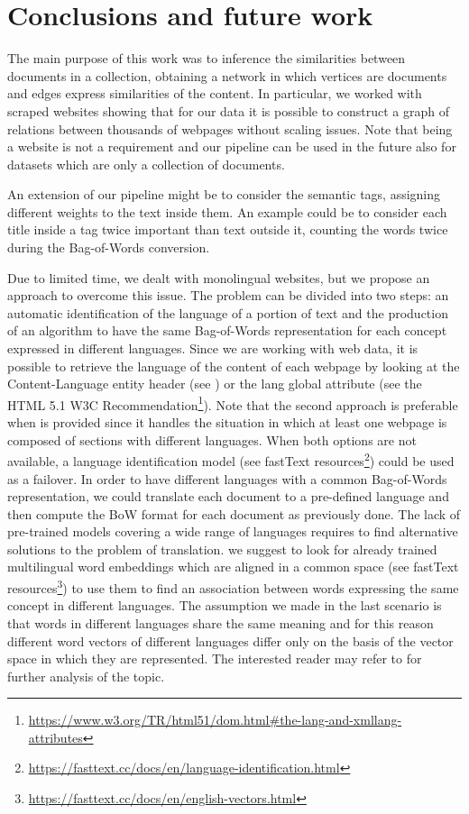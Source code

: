 \chapter{Conclusions and future work} \label{conclusions}
The main purpose of this work was to inference
the similarities between documents in a collection,
obtaining a network in which vertices are documents and
edges express similarities of the content.
In particular, we worked with scraped websites
showing that for our data it is possible to construct
a graph of relations between thousands of webpages
without scaling issues. 
Note that being a website is not a requirement and 
our pipeline can be used in the future also for 
datasets which are only a collection of documents.

An extension of our pipeline might be to consider the semantic tags, 
assigning different weights to the text inside them. 
An example could be to consider each title inside a  
tag twice important than text outside it, 
counting the words twice during the Bag-of-Words conversion.

Due to limited time, we dealt with monolingual
websites, but we propose an approach to overcome this issue.
The problem can be divided into two steps:
an automatic identification of the language of a portion of text and
the production of an algorithm to have the same Bag-of-Words
representation for each concept expressed in different languages.
Since we are working with web data, it is possible to retrieve the language
of the content of each webpage by looking at the Content-Language entity header
(see \cite{rfc7231}) or the lang global attribute
(see the HTML 5.1 W3C Recommendation\footnote{\url{https://www.w3.org/TR/html51/dom.html\#the-lang-and-xmllang-attributes}}).
Note that the second approach is preferable when  is provided
since it handles the situation in which at least
one webpage is composed of sections with different languages.
When both options are not available,
a language identification model
(see fastText resources\footnote{\url{https://fasttext.cc/docs/en/language-identification.html}})
could be used as a failover.
In order to have different languages with a common Bag-of-Words
representation, we could translate each document to a pre-defined language
and then compute the BoW format for each document as previously done.
The lack of pre-trained models covering a wide range
of languages requires to find alternative solutions to the problem of translation.
we suggest to look for already trained multilingual word embeddings
which are aligned in a common space (see fastText resources\footnote{\url{https://fasttext.cc/docs/en/english-vectors.html}})
to use them to find an association between words expressing the same concept in different languages.
The assumption we made in the last scenario is that words in different languages share
the same meaning and for this reason different word vectors of different languages differ only on the basis
of the vector space in which they are represented.
The interested reader may refer to \cite{DBLP:journals/corr/abs-1804-07745} for further analysis of the topic.

